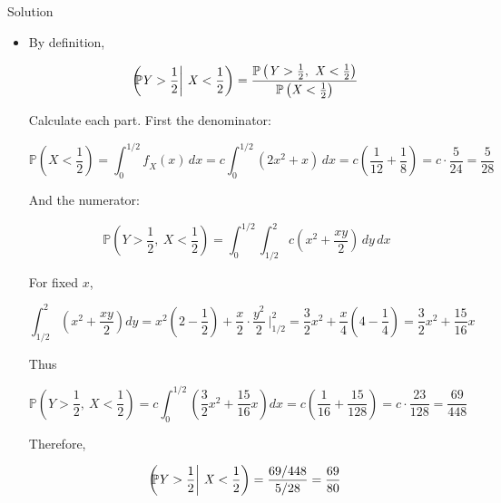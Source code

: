 \begin{qlsolution}{Solution}
\begin{itemize}
  Therefore

  \[\mathbb{P}(\mathit{X} > \mathit{Y}) = \mathit{c}\int_{0}^{1}\frac{5}{4}\mathit{x}^{3}\,\mathit{d}\mathit{x} = \mathit{c} \cdot \frac{5}{4} \cdot \frac{1}{4} = \mathit{c} \cdot \frac{5}{16} = \frac{6}{7} \cdot \frac{5}{16} = \frac{15}{56}\]
\item
  By definition,

  \[\mathbb{P}\mspace{-18mu}\left( \mathit{Y} > \frac{1}{2} \middle| \ \mathit{X} < \frac{1}{2} \right) = \frac{\mathbb{P}\left( {\mathit{Y} > \frac{1}{2},\ \mathit{X} < \frac{1}{2}} \right)}{\mathbb{P}\left( {\mathit{X} < \frac{1}{2}} \right)}\]

  Calculate each part. First the denominator:

  \[\mathbb{P}\left( {\mathit{X} < \frac{1}{2}} \right) = \int_{0}^{1/2}\mathit{f}_{\mathit{X}}(\mathit{x})\,\mathit{d}\mathit{x} = \mathit{c}\int_{0}^{1/2}(2\mathit{x}^{2} + \mathit{x})\,\mathit{d}\mathit{x} = \mathit{c}\left( {\frac{1}{12} + \frac{1}{8}} \right) = \mathit{c} \cdot \frac{5}{24} = \frac{5}{28}\]

  And the numerator:

  \[\mathbb{P}\left( {\mathit{Y} > \frac{1}{2},\ \mathit{X} < \frac{1}{2}} \right) = \int_{0}^{1/2}\int_{1/2}^{2}\mathit{c}\left( {\mathit{x}^{2} + \frac{\mathit{x}\mathit{y}}{2}} \right)\,\mathit{d}\mathit{y}\,\mathit{d}\mathit{x}\]

  For fixed \(\mathit{x}\),

  \[\int_{1/2}^{2}\left( {\mathit{x}^{2} + \frac{\mathit{x}\mathit{y}}{2}} \right)\mathit{d}\mathit{y} = \mathit{x}^{2}\left( {2 - \frac{1}{2}} \right) + \frac{\mathit{x}}{2} \cdot \frac{\mathit{y}^{2}}{2}\ |_{1/2}^{2} = \frac{3}{2}\mathit{x}^{2} + \frac{\mathit{x}}{4}\left( {4 - \frac{1}{4}} \right) = \frac{3}{2}\mathit{x}^{2} + \frac{15}{16}\mathit{x}\]

  Thus

  \[\mathbb{P}\left( {\mathit{Y} > \frac{1}{2},\ \mathit{X} < \frac{1}{2}} \right) = \mathit{c}\int_{0}^{1/2}\left( {\frac{3}{2}\mathit{x}^{2} + \frac{15}{16}\mathit{x}} \right)\mathit{d}\mathit{x} = \mathit{c}\left( {\frac{1}{16} + \frac{15}{128}} \right) = \mathit{c} \cdot \frac{23}{128} = \frac{69}{448}\]

  Therefore,

  \[\mathbb{P}\mspace{-18mu}\left( \mathit{Y} > \frac{1}{2} \middle| \ \mathit{X} < \frac{1}{2} \right) = \frac{69/448}{5/28} = \frac{69}{80}\]
\end{itemize}

\end{qlsolution}
